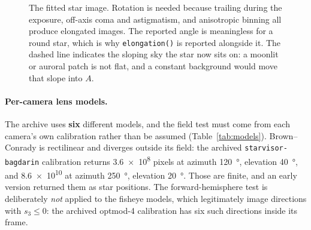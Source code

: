 \documentclass[11pt,a4paper]{article}
\begin{document}
\begin{figure}[h]
\centering
{}
\caption{The fitted star image. Rotation is needed because trailing during the
exposure, off-axis coma and astigmatism, and anisotropic binning all produce
elongated images. The reported angle is meaningless for a round star, which is
why \texttt{elongation()} is reported alongside it. The dashed line indicates
the sloping sky the star now sits on: a moonlit or auroral patch is not flat,
and a constant background would move that slope into $A$.}
\label{fig:gauss}
\end{figure}

\paragraph{Per-camera lens models.} The archive uses \textbf{six} different
models, and the field test must come from each camera's own calibration rather
than be assumed (Table~\ref{tab:models}). Brown--Conrady is rectilinear and
diverges outside its field: the archived \texttt{starvisor-bagdarin} calibration
returns \num{3.6e8} pixels at azimuth \SI{120}{\degree}, elevation
\SI{40}{\degree}, and \num{8.6e10} at azimuth \SI{250}{\degree}, elevation
\SI{20}{\degree}. Those are finite, and an early version returned them as star
positions. The forward-hemisphere test is deliberately \emph{not} applied to the
fisheye models, which legitimately image directions with $s_3\le0$: the archived
optmod-4 calibration has six such directions inside its frame.
\end{document}
